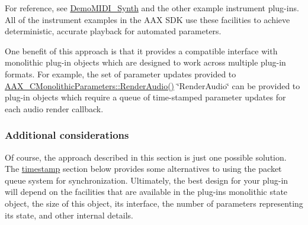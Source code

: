 For reference, see \hyperlink{a00376_DemoMIDI_Synth}{Demo\+M\+I\+D\+I\+\_\+\+Synth} and the other example instrument plug-\/ins. All of the instrument examples in the A\+A\+X S\+D\+K use these facilities to achieve deterministic, accurate playback for automated parameters.

One benefit of this approach is that it provides a compatible interface with monolithic plug-\/in objects which are designed to work across multiple plug-\/in formats. For example, the set of parameter updates provided to \hyperlink{a00026_a04f2f73d70ea28c17747c68fc3a20fc8}{A\+A\+X\+\_\+\+C\+Monolithic\+Parameters\+::\+Render\+Audio()} \char`\"{}\+Render\+Audio\char`\"{} can be provided to plug-\/in objects which require a queue of time-\/stamped parameter updates for each audio render callback.\hypertarget{a00351_parameterUpdateTiming_considerations}{}\subsubsection{Additional considerations}\label{a00351_parameterUpdateTiming_considerations}
Of course, the approach described in this section is just one possible solution. The \hyperlink{a00351_parameterUpdateTiming_timestamps}{timestamp} section below provides some alternatives to using the packet queue system for synchronization. Ultimately, the best design for your plug-\/in will depend on the facilities that are available in the plug-\/in\textquotesingle{}s monolithic state object, the size of this object, its interface, the number of parameters representing its state, and other internal details.

